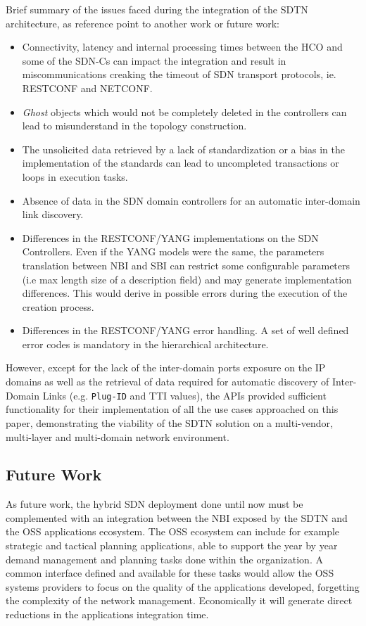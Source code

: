 \documentclass[a4paper,fleqn]{cas-dc}
\begin{document}
Brief summary of the issues faced during the integration of the SDTN architecture, as reference point to another work or future work: 

\begin{itemize}
    \item Connectivity, latency and internal processing times between the HCO and some of the SDN-Cs can impact the integration and result in miscommunications creaking the timeout of SDN transport protocols, ie. RESTCONF and NETCONF.  
    \item \textit{Ghost} objects which would not be completely deleted in the controllers can lead to misunderstand in the topology construction. 
    \item The unsolicited data retrieved by a lack of standardization or a bias in the implementation of the standards can lead to uncompleted transactions or loops in execution tasks.
    \item Absence of data in the SDN domain controllers for an automatic inter-domain link discovery.
    \item Differences in the RESTCONF/YANG implementations on the SDN Controllers. Even if the YANG models were the same, the parameters translation between NBI and SBI can restrict some configurable parameters (i.e max length size of a description field) and may generate implementation differences. This would derive in possible errors during the execution of the creation process.
    \item Differences in the RESTCONF/YANG error handling. A set of well defined error codes is mandatory in the hierarchical architecture.
\end{itemize}

However, except for the lack of the inter-domain ports exposure on the IP domains as well as the retrieval of data required for automatic discovery of Inter-Domain Links (e.g. \texttt{Plug-ID} and TTI values), the APIs provided sufficient functionality for their implementation of all the use cases approached on this paper, demonstrating the viability of the SDTN solution on a multi-vendor, multi-layer and multi-domain network environment.

\subsection{Future Work}
As future work, the hybrid SDN deployment done until now must be complemented with an integration between the NBI exposed by the SDTN and the OSS applications ecosystem. The OSS ecosystem can include for example strategic and tactical planning applications, able to support the year by year demand management and planning tasks done within the organization. A common interface defined and available for these tasks would allow the OSS systems providers to focus on the quality of the applications developed, forgetting the complexity of the network management. Economically it will generate direct reductions in the applications integration time.
\end{document}
